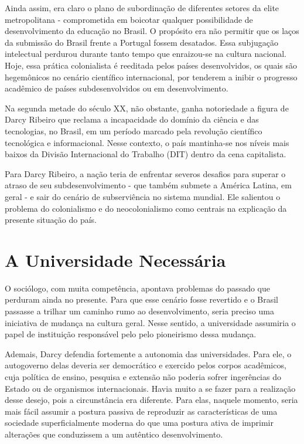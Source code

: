 \documentclass{sbrt}
\begin{document}
Ainda assim, era claro o plano de subordinação de diferentes setores da elite metropolitana - comprometida em boicotar qualquer possibilidade de desenvolvimento da educação no Brasil. O propósito era não permitir que os laços da submissão do Brasil frente a Portugal fossem desatados. Essa subjugação intelectual perdurou durante tanto tempo que enraizou-se na cultura nacional. Hoje, essa prática colonialista é reeditada pelos países desenvolvidos, os quais são hegemônicos no cenário científico internacional, por tenderem a inibir o progresso acadêmico de países subdesenvolvidos ou em desenvolvimento.

Na segunda metade do século XX, não obstante, ganha notoriedade a figura de Darcy Ribeiro que reclama a incapacidade do domínio da ciência e das tecnologias, no Brasil, em um período marcado pela revolução científico tecnológica e informacional. Nesse contexto, o país mantinha-se nos níveis mais baixos da Divisão Internacional do Trabalho (DIT) dentro da cena capitalista.

Para Darcy Ribeiro, a nação teria de enfrentar severos desafios para superar o atraso de seu subdesenvolvimento - que também submete a América Latina, em geral - e sair do cenário de subserviência no sistema mundial. Ele salientou o problema do colonialismo e do neocolonialismo como centrais na explicação da presente situação do país.

\section{A Universidade Necessária}

O sociólogo, com muita competência, apontava problemas do passado que perduram ainda no presente. Para que esse cenário fosse revertido e o Brasil passasse a trilhar um caminho rumo ao desenvolvimento, seria preciso uma iniciativa de mudança na cultura geral. Nesse sentido, a universidade assumiria o papel de instituição responsável pelo pelo pioneirismo dessa mudança.

Ademais, Darcy defendia fortemente a autonomia das universidades. Para ele, o autogoverno delas deveria ser democrático e exercido pelos corpos acadêmicos, cuja política de ensino, pesquisa e extensão não poderia sofrer ingerências do Estado ou de organismos internacionais. Havia muito a se fazer para a realização desse desejo, pois a circunstância era diferente. Para elas, naquele momento, seria mais fácil assumir a postura passiva de reproduzir as características de uma sociedade superficialmente moderna do que uma postura ativa de imprimir alterações que conduzissem a um autêntico desenvolvimento.
\end{document}
